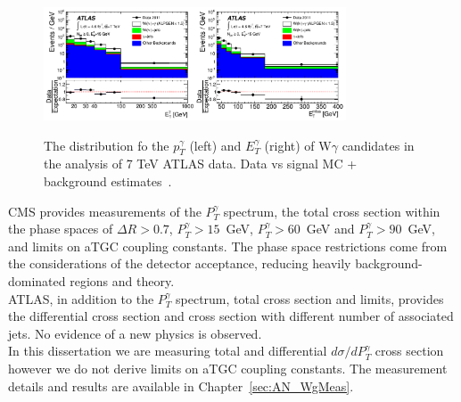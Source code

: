 \begin{figure}[htb]
  \begin{center}
    {\includegraphics[width=0.80\textwidth]{../figs/WgAbout/Wg7TeV_ATLAS_ptGamma.png}}
    \caption{The distribution fo the $p_T^\gamma$ (left) and $E_T^\gamma$ (right) of W$\gamma$ candidates in the analysis of 7 TeV ATLAS data. Data vs signal MC + background estimates~\cite{ref_7TeV_ATLAS}. }
    \label{fig:Wg7TeV_ATLAS_ptGamma}
  \end{center}
\end{figure}

CMS provides measurements of the $P_T^\gamma$ spectrum, the total cross section within the phase spaces of $\Delta R>0.7$, $P_T^\gamma>15$~GeV, $P_T^\gamma>60$~GeV and $P_T^\gamma>90$~GeV, and limits on aTGC coupling constants. The phase space restrictions come from the considerations of the detector acceptance, reducing heavily background-dominated regions and theory.\\

ATLAS, in addition to the $P_T^\gamma$ spectrum, total cross section and limits, provides the differential cross section and cross section with different number of associated jets. No evidence of a new physics is observed.\\

In this dissertation we are measuring total and differential $d\sigma/d P_T^\gamma$ cross section however we do not derive limits on aTGC coupling constants. The measurement details and results are available in Chapter~\ref{sec:AN_WgMeas}.\\
